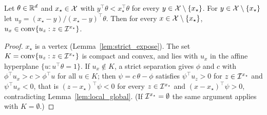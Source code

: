 \begin{lemma}
  \label{lem:cone_form}
  \leanok
  Let $\theta \in \mathbb{R}^d$ and $x_\star \in \mathcal{X}$ with $y^\top \theta < x_\star^\top \theta$ for every
  $y \in \mathcal{X} \setminus \{x_\star\}$. For $y \in \mathcal{X} \setminus \{x_\star\}$ let
  $u_y = (x_\star - y) / (x_\star - y)^\top \theta$. Then for every $x \in \mathcal{X} \setminus \{x_\star\}$,
  $u_x \in \operatorname{conv}\{u_z : z \in \mathcal{I}^{x_\star}\}$.
\end{lemma}

\begin{proof}
  \leanok
  $x_\star$ is a vertex (Lemma~\ref{lem:strict_expose}). The set $K = \operatorname{conv}\{u_z : z \in
  \mathcal{I}^{x_\star}\}$ is compact and convex, and lies with $u_x$ in the affine hyperplane
  $\{u : u^\top \theta = 1\}$. If $u_x \notin K$, a strict separation gives $\phi$ and $c$ with
  $\phi^\top u_x > c > \phi^\top u$ for all $u \in K$; then $\psi = c\,\theta - \phi$ satisfies
  $\psi^\top u_z > 0$ for $z \in \mathcal{I}^{x_\star}$ and $\psi^\top u_x < 0$, that is
  $(z - x_\star)^\top \psi < 0$ for every $z \in \mathcal{I}^{x_\star}$ and $(x - x_\star)^\top \psi > 0$,
  contradicting Lemma~\ref{lem:local_global}. (If $\mathcal{I}^{x_\star} = \emptyset$ the same argument
  applies with $K = \emptyset$.)
\end{proof}
